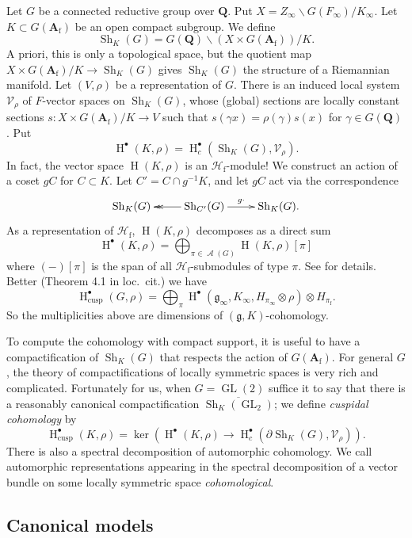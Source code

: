 \documentclass{article}
\DeclareMathOperator{\automorphic}{\mathcal{A}}
\DeclareMathOperator{\GL}{GL}
\DeclareMathOperator{\h}{H}
\DeclareMathOperator{\shimura}{Sh}
\newcommand{\dA}{\mathbf{A}}
\newcommand{\dQ}{\mathbf{Q}}
\newcommand{\fg}{\mathfrak{g}}
\newcommand{\sV}{\mathscr{V}}
\newcommand{\cusp}{\mathrm{cusp}}
\newcommand{\finite}{\mathrm{f}}
\newcommand{\hecke}{\mathcal{H}}
\begin{document}
Let $G$ be a connected reductive group over $\dQ$. Put 
$X=Z_\infty \backslash G(F_\infty) / K_\infty$. Let 
$K\subset G(\dA_\finite)$ be an open compact subgroup. We define 
\[
  \shimura_K(G) = G(\dQ)\backslash (X\times G(\dA_\finite)) / K .
\]
A priori, this is only a topological space, but the quotient map 
$X\times G(\dA_\finite)/K \to \shimura_K(G)$ gives $\shimura_K(G)$ the 
structure of a Riemannian manifold. Let $(V,\rho)$ be a representation of $G$. 
There is an induced local system $\sV_\rho$ of $F$-vector spaces on $\shimura_K(G)$, whose (global) 
sections are locally constant sections $s:X\times G(\dA_\finite)/K \to V$ 
such that $s(\gamma x) = \rho(\gamma) s(x)$ for $\gamma\in G(\dQ)$. Put 
\[
  \h^\bullet(K,\rho) = \h_c^\bullet\left(\shimura_K(G),\sV_\rho\right) .
\]
In fact, the vector space $\h(K,\rho)$ is an $\hecke_\finite$-module! We 
construct an action of a coset $gC$ for $C\subset K$. Let 
$C'=C\cap g^{-1} K$, and let $g C$ act via the correspondence 
\[\xymatrix{
  \shimura_K(G) 
    & \ar@{->>}[l] \shimura_{C'}(G) \ar[r]^-{g\cdot} 
    & \shimura_K(G) .
}\]
As a representation of $\hecke_\finite$, $\h(K,\rho)$ decomposes as a direct 
sum 
\[
  \h^\bullet(K,\rho) = \bigoplus_{\pi\in \automorphic(G)} \h(K,\rho)[\pi]
\]
where $(-)[\pi]$ is the span of all $\hecke_\finite$-submodules of type $\pi$. 
See \cite{s09} for details. Better (Theorem 4.1 in loc.~cit.) we have 
\[
  \h^\bullet_\cusp(G,\rho) = \bigoplus_\pi \h^\bullet(\fg_\infty,K_\infty,H_{\pi_\infty}\otimes \rho)\otimes H_{\pi_\finite} .
\]
So the multiplicities above are dimensions of $(\fg,K)$-cohomology. 

To compute the cohomology with compact support, it is useful to have a 
compactification of $\shimura_K(G)$ that respects the action of 
$G(\dA_\finite)$. For general $G$, the theory of compactifications of locally 
symmetric spaces is very rich and complicated. Fortunately for us, when 
$G=\GL(2)$ suffice it to say that there is a reasonably canonical 
compactification $\overline{\shimura_K(\GL_2)}$; we define \emph{cuspidal 
cohomology} by 
\[
  \h_\cusp^\bullet(K,\rho) = \ker\left(\h^\bullet(K,\rho) \to \h_c^\bullet(\partial \shimura_K(G),\sV_\rho)\right) .
\]
There is also a spectral decomposition of automorphic cohomology. We call
automorphic representations appearing in the spectral decomposition of a vector 
bundle on some locally symmetric space \emph{cohomological}. 


\subsection{Canonical models}\label{sec:can-model}
\end{document}
